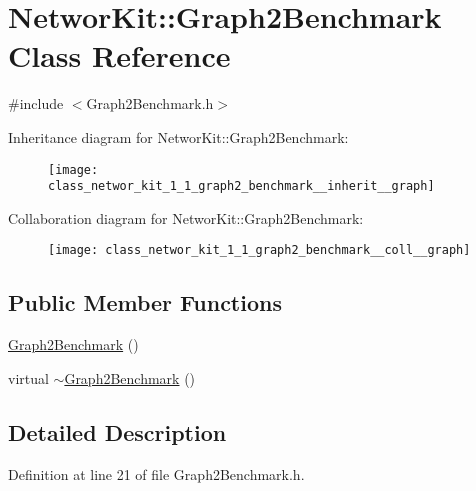 \hypertarget{class_networ_kit_1_1_graph2_benchmark}{\section{Networ\-Kit\-:\-:Graph2\-Benchmark Class Reference}
\label{class_networ_kit_1_1_graph2_benchmark}
}


{\ttfamily \#include $<$Graph2\-Benchmark.\-h$>$}



Inheritance diagram for Networ\-Kit\-:\-:Graph2\-Benchmark\-:\nopagebreak
\begin{figure}[H]
\begin{center}
\leavevmode
\texttt{[image: class\_networ\_kit\_1\_1\_graph2\_benchmark\_\_inherit\_\_graph]}
\end{center}
\end{figure}


Collaboration diagram for Networ\-Kit\-:\-:Graph2\-Benchmark\-:\nopagebreak
\begin{figure}[H]
\begin{center}
\leavevmode
\texttt{[image: class\_networ\_kit\_1\_1\_graph2\_benchmark\_\_coll\_\_graph]}
\end{center}
\end{figure}
\subsection*{Public Member Functions}
\begin{DoxyCompactItemize}
\item 
\hyperlink{class_networ_kit_1_1_graph2_benchmark_a31d5521dff12225788c9b3b44f7c9bfc}{Graph2\-Benchmark} ()
\item 
virtual \hyperlink{class_networ_kit_1_1_graph2_benchmark_a86724c1fda1f17b66e2d43d22cb9704b}{$\sim$\-Graph2\-Benchmark} ()
\end{DoxyCompactItemize}


\subsection{Detailed Description}


Definition at line 21 of file Graph2\-Benchmark.\-h.



